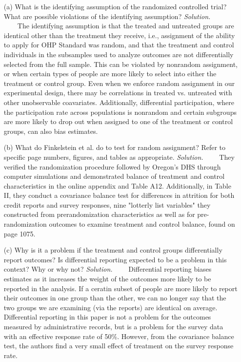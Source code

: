 \documentclass[
]{article}
\begin{document}
\begin{enumerate}
\item[(a)] What is the identifying assumption of the randomized controlled trial? What are possible violations of the identifying assumption?
\newline
\newline
\textit{Solution.}\newline
    The identifying assumption is that the treated and untreated groups are identical other than the treatment they receive, i.e., assignment of the ability to apply for OHP Standard was random, and that the treatment and control individuals in the subsamples used to analyze outcomes are not differentially selected from the full sample. This can be violated by nonrandom assignment, or when certain types of people are more likely to select into either the treatment or control group. Even when we enforce random assignment in our experimental design, there may be correlations in treated vs. untreated with other unobservable coavariates. Additionally, differential participation, where the participation rate across populations is nonrandom and certain subgroups are more likely to drop out when assigned to one of the treatment or control groups, can also bias estimates.  

\item[(b)] What do Finkelstein et al. do to test for random assignment? Refer to specific page numbers, figures, and tables as appropriate.
\newline
\newline
\textit{Solution.}\newline
    They verified the randomization procedure followed by Oregon's DHS through computer simulations and demonstrated balance of treatment and control characteristics in the online appendix and Table A12. Additionally, in Table II, they conduct a covariance balance test for differences in attrition for both credit reports and survey responses, nine "lotterly list variables" they constructed from prerandomization characteristics as well as  for pre-randomization outcomes to examine treatment and control balance, found on page 1075. 

\item[(c)] Why is it a problem if the treatment and control groups differentially report outcomes? Is differential reporting expected to be a problem in this context? Why or why not?
\newline
\newline
\textit{Solution.}\newline
    Differential reporting biases estimates as it increases the weight of the outcomes more likely to be reported in the analysis. If a ceratin subset of people are more likely to report their outcomes in one group than the other, we can no longer say that the two groups we are examining (via the reports) are identical on average. Differential reporting in this paper is not a problem for the outcomes measured by administrative records, but is a problem for the survey data with an effective response rate of 50\%. However, from the covariance balance test, the authors find a very small effect of treatment on the survey response rate. 


\end{enumerate}
\end{document}
